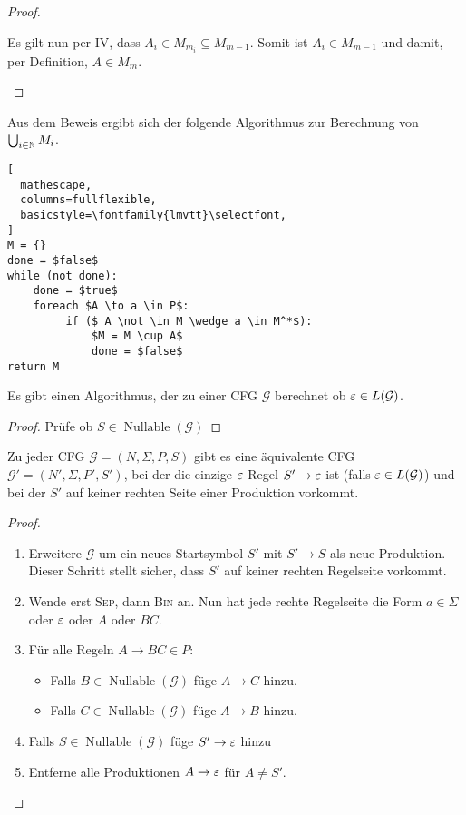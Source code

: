 {\begin{proof}
\begin{description}
    Es gilt nun per IV, dass $A_i \in M_{m_i} \subseteq M_{m-1}$.
    Somit ist $A_i \in M_{m-1}$ und damit, per Definition, $A \in M_m$.
  \end{description}
\end{proof}
Aus dem Beweis ergibt sich der folgende Algorithmus zur Berechnung von $\bigcup_{i \in \mathbb{N}} M_i$.
\begin{lstlisting}[
  mathescape,
  columns=fullflexible,
  basicstyle=\fontfamily{lmvtt}\selectfont,
]
M = {}
done = $false$
while (not done):
    done = $true$
    foreach $A \to a \in P$:
         if ($ A \not \in M \wedge a \in M^*$):
             $M = M \cup A$
             done = $false$
return M
\end{lstlisting}
\begin{Korollar}
  Es gibt einen Algorithmus, der zu einer CFG $\mathcal{G}$ berechnet ob $\varepsilon \in L(\mathcal{G})$.
\end{Korollar}
\begin{proof}
  Prüfe ob $S \in \operatorname{Nullable}(\mathcal{G})$
\end{proof}
\begin{lemma}
  Zu jeder CFG $\mathcal{G}=(N, \Sigma, P, S)$ gibt es eine äquivalente CFG $\mathcal{G'} =(N', \Sigma, P', S')$, bei der die einzige $\varepsilon$-Regel $S' \to \varepsilon$ ist (falls $\varepsilon \in L(\mathcal{G})$) und bei der $S'$ auf keiner rechten Seite einer Produktion vorkommt.
\end{lemma}
\begin{proof}
  \hfill
  \begin{enumerate}
  \item Erweitere $\mathcal{G}$ um ein neues Startsymbol $S'$ mit $S' \to S$ als neue Produktion.
    Dieser Schritt stellt sicher, dass $S'$ auf keiner rechten Regelseite vorkommt.
  \item Wende erst \textsc{Sep}, dann \textsc{Bin} an.
    Nun hat jede rechte Regelseite die Form $a \in \Sigma$ oder $\varepsilon$ oder $A$ oder $BC$.
  \item Für alle Regeln $A \to BC \in P$:
    \begin{itemize}
    \item Falls $B \in \operatorname{Nullable}(\mathcal{G})$ füge $A \to C$ hinzu.
    \item Falls $C \in \operatorname{Nullable}(\mathcal{G})$ füge $A \to B$ hinzu.
    \end{itemize}
  \item Falls $S \in \operatorname{Nullable}(\mathcal{G})$ füge $S' \to \varepsilon$ hinzu
  \item Entferne alle Produktionen $A \to \varepsilon$ für $A \neq S'$.
  \end{enumerate}
\end{proof}

}
